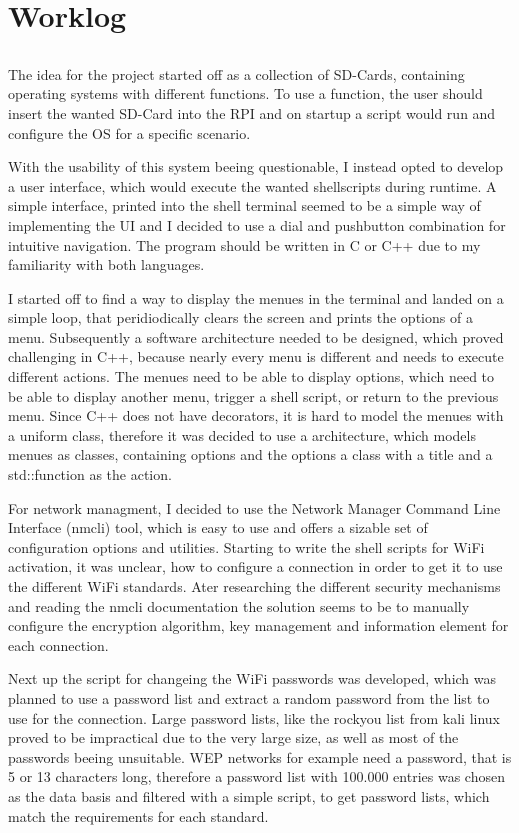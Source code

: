 \chapter{Worklog}\label{ch:worklog}

\section{}
The idea for the project started off as a collection of SD-Cards, containing operating systems with different functions.
To use a function, the user should insert the wanted SD-Card into the RPI and on startup a script would run and configure the OS for a specific scenario.

With the usability of this system beeing questionable, I instead opted to develop a user interface, which would execute the wanted shellscripts during runtime.
A simple interface, printed into the shell terminal seemed to be a simple way of implementing the UI and I decided to use a dial and pushbutton combination for intuitive navigation.
The program should be written in C or C++ due to my familiarity with both languages.

I started off to find a way to display the menues in the terminal and landed on a simple loop, that peridiodically clears the screen and prints the options of a menu.
Subsequently a software architecture needed to be designed, which proved challenging in C++, because nearly every menu is different and needs to execute different actions.
The menues need to be able to display options, which need to be able to display another menu, trigger a shell script, or return to the previous menu.
Since C++ does not have decorators, it is hard to model the menues with a uniform class, therefore it was decided to use a architecture, which models menues as classes, containing options and the options a class with a title and a std::function as the action.

For network managment, I decided to use the Network Manager Command Line Interface (nmcli) tool, which is easy to use and offers a sizable set of configuration options and utilities.
Starting to write the shell scripts for WiFi activation, it was unclear, how to configure a connection in order to get it to use the different WiFi standards.
Ater researching the different security mechanisms and reading the nmcli documentation the solution seems to be to manually configure the encryption algorithm, key management and information element for each connection.

Next up the script for changeing the WiFi passwords was developed, which was planned to use a password list and extract a random password from the list to use for the connection.
Large password lists, like the rockyou list from kali linux proved to be impractical due to the very large size, as well as most of the passwords beeing unsuitable.
WEP networks for example need a password, that is 5 or 13 characters long, therefore a password list with 100.000 entries was chosen as the data basis and filtered with a simple script, to get password lists, which match the requirements for each standard.

